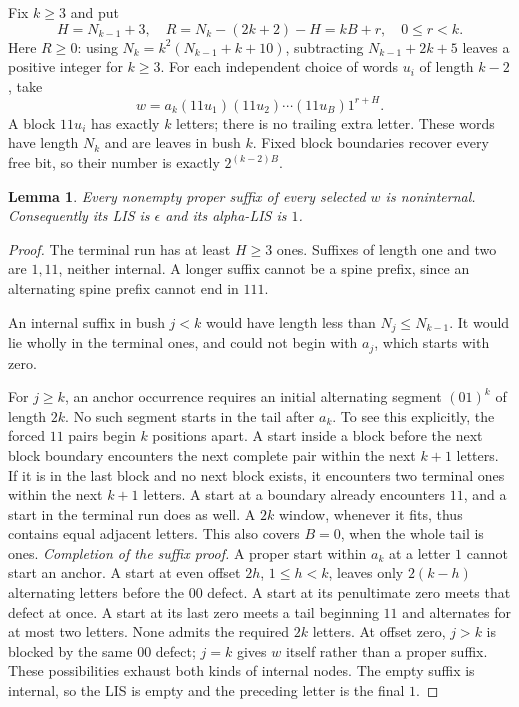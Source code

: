 \documentclass[11pt]{article}
\newtheorem{lemma}{Lemma}
\begin{document}
Fix $k\geq3$ and put
\[
 H=N_{k-1}+3,\quad R=N_k-(2k+2)-H=kB+r,\quad0\leq r<k.
\]
Here $R\geq0$: using $N_k=k^2(N_{k-1}+k+10)$, subtracting
$N_{k-1}+2k+5$ leaves a positive integer for $k\geq3$.
For each independent choice of words $u_i$ of length $k-2$, take
\[
 w=a_k(11u_1)(11u_2)\cdots(11u_B)1^{r+H}.
\]
A block $11u_i$ has exactly $k$ letters; there is no trailing extra letter.
These words have length $N_k$ and are leaves in bush $k$. Fixed block
boundaries recover every free bit, so their number is exactly
$2^{(k-2)B}$.

\begin{lemma}
Every nonempty proper suffix of every selected $w$ is noninternal.
Consequently its LIS is $\epsilon$ and its alpha-LIS is $1$.
\end{lemma}
\begin{proof}
The terminal run has at least $H\geq3$ ones. Suffixes of length one and two
are $1,11$, neither internal. A longer suffix cannot be a spine prefix,
since an alternating spine prefix cannot end in $111$.

An internal suffix in bush $j<k$ would have length less than
$N_j\leq N_{k-1}$. It would lie wholly in the terminal ones, and could
not begin with $a_j$, which starts with zero.

For $j\geq k$, an anchor occurrence requires an initial alternating segment
$(01)^k$ of length $2k$. No such segment starts in the tail after $a_k$.
To see this explicitly, the forced $11$ pairs begin $k$ positions apart.
A start inside a block before the next block boundary encounters the next
complete pair within the next $k+1$ letters. If it is in the last block
and no next block exists, it encounters two terminal ones within the next
$k+1$ letters. A start at a boundary already encounters $11$, and a start
in the terminal run does as well. A $2k$ window, whenever it fits, thus
contains equal adjacent letters. This also covers $B=0$, when the whole
tail is ones.
\newpage
\noindent\emph{Completion of the suffix proof.}
A proper start within $a_k$ at a letter $1$ cannot start an anchor.
A start at even offset $2h$, $1\leq h<k$, leaves only $2(k-h)$ alternating
letters before the $00$ defect. A start at its penultimate zero meets
that defect at once. A start at its last zero meets a tail beginning $11$
and alternates for at most two letters. None admits the required $2k$
letters. At offset zero, $j>k$ is blocked by the same $00$ defect;
$j=k$ gives $w$ itself rather than a proper suffix. These possibilities
exhaust both kinds of internal nodes. The empty suffix is internal,
so the LIS is empty and the preceding letter is the final $1$.
\end{proof}
\end{document}
